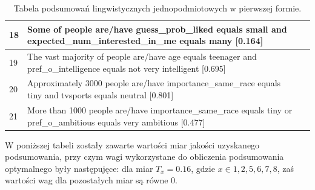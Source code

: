 \documentclass{classrep}
\begin{document}
\begin{center}
\begin{table}[H]
\begin{tabularx}{\textwidth}{lXc}
    18 & Some of people are/have guess\_prob\_liked equals small and expected\_num\_interested\_in\_me equals many [0.164]\\ \hline
    19 & The vast majority of people are/have age equals teenager and pref\_o\_intelligence equals not very intelligent [0.695]\\ \hline
    20 & Approximately 3000 people are/have importance\_same\_race equals tiny and tvsports equals neutral [0.801]\\ \hline
    21 & More than 1000 people are/have importance\_same\_race equals tiny or pref\_o\_ambitious equals very ambitious [0.477]\\ \hline
  \end{tabularx}
  \caption{Tabela podsumowań lingwistycznych jednopodmiotowych w pierwszej formie.}
\end{table}
\end{center}

W poniższej tabeli zostały zawarte wartości miar jakości uzyskanego podsumowania, przy czym wagi wykorzystane do
obliczenia podsumowania optymalnego były następujęce: dla miar $T_{x} = 0.16$, gdzie $x \in {1,2,5,6,7,8}$, zaś wartości wag dla pozostałych miar są równe 0.
\end{document}
